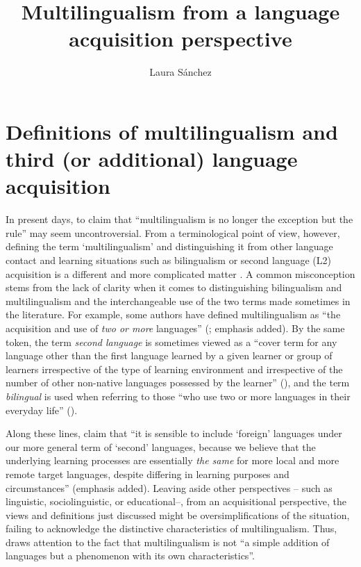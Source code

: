 \documentclass[output=paper,colorlinks,citecolor=brown,nonflat]{langsci/langscibook}
\author{Laura Sánchez \affiliation{Stockholms universitet}}
\title{Multilingualism from a language acquisition perspective}
\begin{document}
\maketitle



\section{Definitions of multilingualism and third (or additional) language acquisition}\label{sec:sanchez1:1}

In present days, to claim that “multilingualism is no longer the exception but the rule” \citep[113]{Sánchez2019CLIL} may seem uncontroversial. From a terminological point of view, however, defining the term ‘multilingualism’ and distinguishing it from other language contact and learning situations such as bilingualism or second language (L2) acquisition is a different and more complicated matter \citep{Cenoz2013}. A common misconception stems from the lack of clarity when it comes to distinguishing bilingualism and multilingualism and the interchangeable use of the two terms made sometimes in the literature. For example, some authors have defined multilingualism as “the acquisition and use of \textit{two or more} languages” (\citealt[2]{AroninSingleton2008}; emphasis added). By the same token, the term \textit{second language} is sometimes viewed as a “cover term for any language other than the first language learned by a given learner or group of learners irrespective of the type of learning environment and irrespective of the number of other non-native languages possessed by the learner” (\citealt[7]{SharwoodSmith1994}), and the term \textit{bilingual} is used when referring to those “who use two or more languages in their everyday life” (\citealt[xiii]{Grosjean2010}).

Along these lines, \citet[2]{MitchellMyles1998} claim that “it is sensible to include ‘foreign’ languages under our more general term of ‘second’ languages, because we believe that the underlying learning processes are essentially \textit{the same} for more local and more remote target languages, despite differing in learning purposes and circumstances” (emphasis added). Leaving aside other perspectives – such as linguistic, sociolinguistic, or educational–, from an acquisitional perspective, the views and definitions just discussed might be oversimplifications of the situation, failing to acknowledge the distinctive characteristics of multilingualism. Thus, \citet[14]{Cenoz2013} draws attention to the fact that multilingualism is not “a simple addition of languages but a phenomenon with its own characteristics”.
\end{document}
